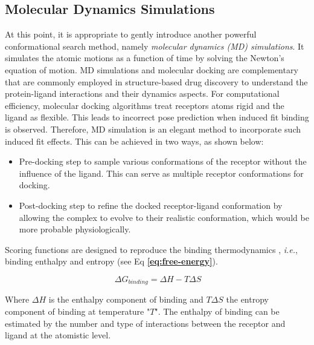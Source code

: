 \subsection*{Molecular Dynamics Simulations}
At this point, it is appropriate to gently introduce another powerful conformational search method, namely \textit{molecular dynamics (MD) simulations}. It simulates the atomic motions as a function of time by solving the Newton's equation of motion\cite{bib24}. 
MD simulations and molecular docking are complementary\cite{bib25, bib26} that are commonly employed in structure-based drug discovery to understand the protein-ligand interactions and their dynamics aspects. For computational efficiency, molecular docking algorithms treat receptors atoms rigid and the ligand as flexible. This leads to incorrect pose prediction when induced fit binding is observed. Therefore, MD simulation is an elegant method to incorporate such induced fit effects. This can be achieved in two ways, as shown below:
\begin{itemize}
\item Pre-docking step to sample various conformations of the receptor without the influence of the ligand.  This can serve as multiple receptor conformations for docking. 
\item Post-docking step to refine the docked receptor-ligand conformation by allowing the complex to evolve to their realistic conformation, which would be more probable physiologically.
\end{itemize}



Scoring functions are designed to reproduce the binding thermodynamics \cite{bib2, bib3}, \textit{i.e.}, binding enthalpy and entropy (see Eq \textbf{\ref{eq:free-energy}}).

\begin{equation} 
    \label{eq:free-energy}
    \   {\Delta}G_{binding} = {\Delta}H - T{\Delta}S   
\end{equation}

Where  \({\Delta}H\) is the enthalpy component of binding and \(T{\Delta}S\) the entropy component of binding at temperature "$T$".
The enthalpy of binding can be estimated by the number and type of interactions between the receptor and ligand at the atomistic level. {}

